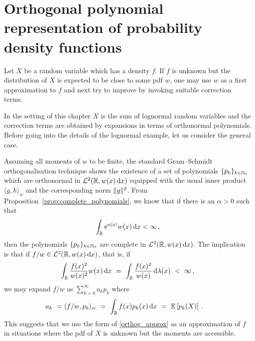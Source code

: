 \section{Orthogonal polynomial representation of probability density functions}
\label{S:OrthPol}

Let $X$ be a random variable which has a density $f$. If $f$ is unknown but the distribution of $X$ is
expected to be close to some pdf $w$, one may use $w$ as a first approximation to $f$ and next try
to improve by invoking suitable correction terms.

In the setting of this chapter $X$ is the sum of lognormal random variables and the correction terms are obtained by expansions in terms of orthonormal polynomials.
Before going into the details of the lognormal example, let us consider the general case.

\newpage
Assuming all moments of $w$ to be finite,
the standard Gram--Schmidt orthogonalisation technique shows the existence
of a set of polynomials $\{p_k\}_{k\in\mathbb{N}_0}$ which are orthonormal in
$\mathcal{L}^2(\mathbb{R}, w(x) \mathop{}\!\mathrm{d} x)$ equipped with the usual inner product
$\langle g, h \rangle_w$ and the corresponding norm
$\lVert g\rVert^2$.
From Proposition~\ref{prop:complete_polynomials}, we know that if there is an $\alpha>0$ such that
\begin{equation}\label{DefinedMGFCondition}
\int_{\mathbb{R}} \mathrm{e}^{\alpha|x|} w(x) \mathop{}\!\mathrm{d} x < \infty\,,
\end{equation}
then the polynomials $\{p_k\}_{k\in\mathbb{N}_0}$ are complete in $\mathcal{L}^2(\mathbb{R}, w(x) \mathop{}\!\mathrm{d} x)$. The implication is that if $f/w \in \mathcal{L}^2(\mathbb{R}, w(x) \mathop{}\!\mathrm{d} x)$, that is, if
\begin{equation}\label{L2Condition1}
\int_{\mathbb{R}} \frac{f(x)^2}{w(x)^2} w(x) \mathop{}\!\mathrm{d} x\ =\ \int_{\mathbb{R}} \frac{f(x)^2}{w(x)}\mathop{}\!\mathrm{d} \lambda(x)\ <\ \infty\,,
\end{equation}
we may expand $f/w$ as $\sum_{k=0}^\infty a_k p_k$ where
\begin{align}\label{28.10a}a_k\ &=
\langle f/w, p_k \rangle_w\ =\ \int_{\RL} f(x) p_k(x) \dd x\ =\ \Exp\left[p_k(X)\right]\,.
\end{align}
This suggests that we use the form of \eqref{orthog_approx} as an approximation of $f$ in situations where the pdf of $X$ is unknown but the moments are accessible.

